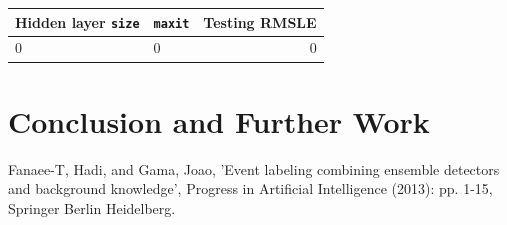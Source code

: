 \documentclass[12pt]{article}
\begin{document}
\begin{table}[H]
	\centering
	\begin{tabular}{llr}
		Hidden layer \texttt{size} & \texttt{maxit} & Testing RMSLE \\
		\hline
		0 & 0 & 0\\
	\end{tabular}
\end{table}
\section{Conclusion and Further Work}
	\label{sec:conclusion}
	
\begin{thebibliography}{9}
		Fanaee-T, Hadi, and Gama, Joao, 'Event labeling combining ensemble detectors and background knowledge', Progress in Artificial Intelligence (2013): pp. 1-15, Springer Berlin Heidelberg.
	\end{thebibliography}
	
\end{document}
